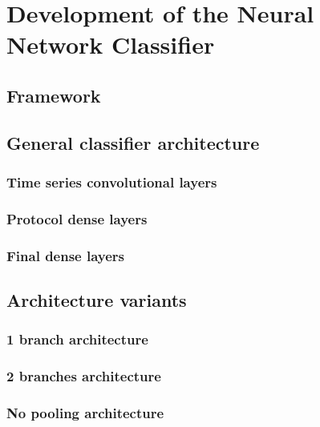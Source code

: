 \chapter{Development of the Neural Network Classifier}

\lipsum[1]

\section{Framework}
\lipsum[1]

\section{General classifier architecture}
\lipsum[1]
\subsection{Time series convolutional layers}
\lipsum[1]
\subsection{Protocol dense layers}
\lipsum[1]
\subsection{Final dense layers}
\lipsum[1]

\section{Architecture variants}
\lipsum[1]
\subsection{1 branch architecture}
\lipsum[1]
\subsection{2 branches architecture}
\lipsum[1]
\subsection{No pooling architecture}
\lipsum[1]

